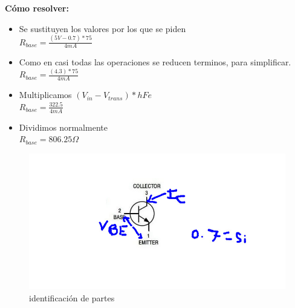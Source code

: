 \documentclass[letterpaper]{article}
\begin{document}
\begin{large}
\textbf{Cómo resolver:}
\end{large}
\begin{itemize}
	\item Se sustituyen los valores por los que se piden\\
	$R_{base}=\frac{(5V-0.7)*75}{4mA}$\\
	\item Como en casi todas las operaciones se reducen terminos, para simplificar.\\
	$R_{base}=\frac{(4.3)*75}{4mA}$
	\item Multiplicamos $ (V_{in}-V_{trans})*hFe $\\ 
	$R_{base}=\frac{322.5}{4mA}$
	\item Dividimos normalmente\\
	$R_{base} = 806.25\Omega $
\end{itemize}
\newpage
\begin{figure}[hbtp]
\caption{identificación de partes}
\centering
\includegraphics[scale=0.5]{img/dadada.jpg}
\end{figure}
\end{document}
